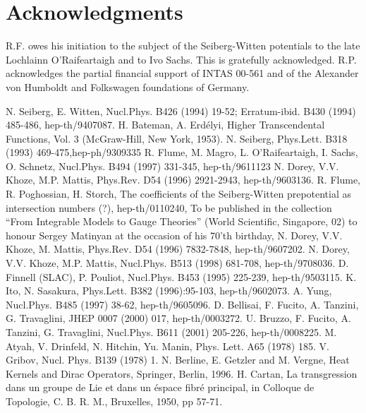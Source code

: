 \documentclass[a4paper,12pt]{article}
\begin{document}
\section*{Acknowledgments}
R.F. owes his initiation to the subject of the Seiberg-Witten 
potentials to the late Lochlainn O'Raifeartaigh and to Ivo Sachs. 
This is gratefully  acknowledged.
R.P. acknowledges the partial financial support of INTAS 00-561 
and of the Alexander von Humboldt and Folkswagen foundations of Germany.

\begin{thebibliography}{99}
N. Seiberg, E. Witten, Nucl.Phys. B426 (1994) 19-52; 
Erratum-ibid. B430 (1994) 485-486, hep-th/9407087. 
H. Bateman, A. Erd\'{e}lyi, Higher Transcendental 
Functions, Vol. 3 (McGraw-Hill, New York, 1953).
N. Seiberg, Phys.Lett. B318 (1993) 469-475,hep-ph/9309335  
 R. Flume, M. Magro, L. O'Raifeartaigh, I. Sachs, O. Schnetz, 
Nucl.Phys. B494 (1997) 331-345, hep-th/9611123 
N. Dorey, V.V. Khoze, M.P. Mattis, 
Phys.Rev. D54 (1996) 2921-2943, hep-th/9603136.
R. Flume, R. Poghossian, H. Storch, The coefficients of 
the Seiberg-Witten prepotential as intersection numbers (?), hep-th/0110240, 
To be published in the collection ``From Integrable Models to Gauge 
Theories'' (World Scientific, Singapore, 02) to honour Sergey Matinyan at 
the occasion of his 70'th birthday,
N. Dorey, V.V. Khoze, M. Mattis, 
Phys.Rev. D54 (1996) 7832-7848, hep-th/9607202. 
N. Dorey, V.V. Khoze, M.P. Mattis, 
Nucl.Phys. B513 (1998) 681-708, hep-th/9708036.
D. Finnell (SLAC), P. Pouliot, Nucl.Phys. B453 (1995) 
225-239, 
hep-th/9503115. 
K. Ito, N. Sasakura, Phys.Lett. B382 (1996):95-103, 
hep-th/9602073.
 A. Yung, Nucl.Phys. B485 (1997) 38-62,  hep-th/9605096.
 D. Bellisai, F. Fucito, A. Tanzini, G. Travaglini, 
JHEP 0007 (2000) 017, hep-th/0003272.
 U. Bruzzo, F. Fucito, A. Tanzini, G. Travaglini, 
Nucl.Phys. B611 (2001) 205-226, hep-th/0008225.  
M. Atyah, V. Drinfeld, N. Hitchin, Yu. Manin, 
Phys. Lett. A65 (1978) 185. 
V. Gribov, Nucl. Phys. B139 (1978) 1.
N. Berline, E. Getzler and M. Vergne, 
Heat Kernels and Dirac Operators, Springer, Berlin, 1996. 
H. Cartan, La transgression dans un groupe de Lie 
et dans un \'{e}space fibr\'{e} principal, in Colloque de Topologie, 
C. B. R. M., Bruxelles, 1950, pp 57-71.

\end{thebibliography}
\end{document}
